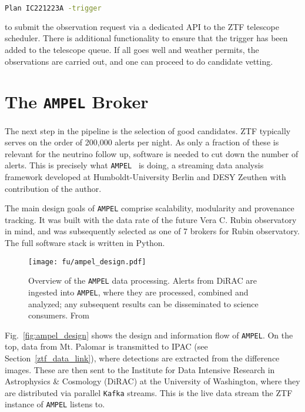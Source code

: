 \begin{lstlisting}[language=bash,style=kaolstplain]
Plan IC221223A -trigger
\end{lstlisting}

to submit the observation request via a dedicated API to the ZTF telescope scheduler. There is additional functionality to ensure that the trigger has been added to the telescope queue. If all goes well and weather permits, the observations are carried out, and one can proceed to do candidate vetting.

\section{The \texttt{AMPEL} Broker}\label{ampel}

The next step in the pipeline is the selection of good candidates. ZTF typically serves on the order of 200,000 alerts per night. As only a fraction of these is relevant for the neutrino follow up, software is needed to cut down the number of alerts. This is precisely what \texttt{AMPEL}~ is doing, a streaming data analysis framework developed at Humboldt-University Berlin and DESY Zeuthen with contribution of the author.

The main design goals of \texttt{AMPEL} comprise scalability, modularity and provenance tracking. It was built with the data rate of the future Vera C. Rubin observatory~ in mind, and was subsequently selected as one of 7 brokers for Rubin observatory. The full software stack is written in Python.

\begin{figure}[h!]
    \texttt{[image: fu/ampel\_design.pdf]}
    \caption[\texttt{AMPEL} overview]{Overview of the \texttt{AMPEL} data processing. Alerts from DiRAC are ingested into \texttt{AMPEL}, where they are processed, combined and analyzed; any subsequent results can be disseminated to science consumers. From~\cite{Nordin2019}}
\end{figure}

Fig.~\ref{fig:ampel_design} shows the design and information flow of \texttt{AMPEL}. On the top, data from Mt. Palomar is transmitted to IPAC (see Section~\ref{ztf_data_link}), where detections are extracted from the difference images. These are then sent to the Institute for Data Intensive Research in Astrophysics \& Cosmology (DiRAC) at the University of Washington, where they are distributed via parallel \texttt{Kafka} streams. This is the live data stream the ZTF instance of \texttt{AMPEL} listens to.

